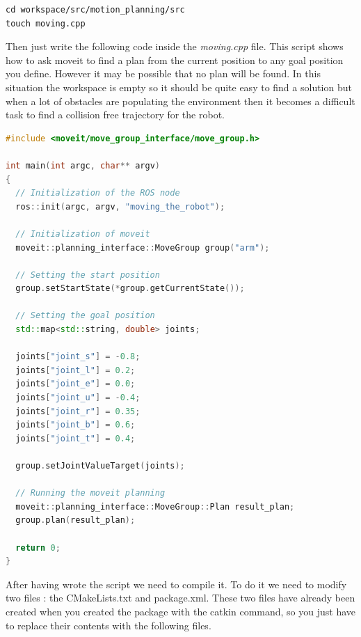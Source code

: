 \begin{lstlisting}
cd workspace/src/motion_planning/src
touch moving.cpp
\end{lstlisting}

Then just write the following code inside the \emph{moving.cpp} file. This script shows how to ask moveit to find a plan from the current position to any goal position you define. However it may be possible that no plan will be found. In this situation the workspace is empty so it should be quite easy to find a solution but when a lot of obstacles are populating the environment then it becomes a difficult task to find a collision free trajectory for the robot.

\begin{lstlisting}[language=c++,caption=moving.cpp]
#include <moveit/move_group_interface/move_group.h>

int main(int argc, char** argv)
{
  // Initialization of the ROS node
  ros::init(argc, argv, "moving_the_robot");

  // Initialization of moveit 
  moveit::planning_interface::MoveGroup group("arm");

  // Setting the start position
  group.setStartState(*group.getCurrentState());

  // Setting the goal position
  std::map<std::string, double> joints;
      
  joints["joint_s"] = -0.8;
  joints["joint_l"] = 0.2;
  joints["joint_e"] = 0.0;
  joints["joint_u"] = -0.4;
  joints["joint_r"] = 0.35;
  joints["joint_b"] = 0.6;
  joints["joint_t"] = 0.4;
      
  group.setJointValueTarget(joints);

  // Running the moveit planning
  moveit::planning_interface::MoveGroup::Plan result_plan;
  group.plan(result_plan);
  
  return 0;
}
\end{lstlisting}



After having wrote the script we need to compile it. To do it we need to modify two files : the CMakeLists.txt and package.xml. These two files have already been created when you created the package with the catkin command, so you just have to replace their contents with the following files.


